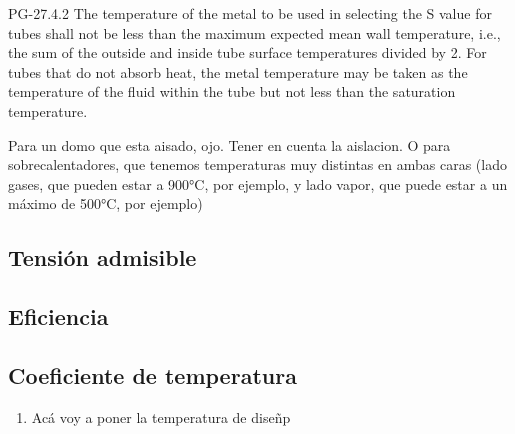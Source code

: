 PG-27.4.2
The temperature of the metal to be used
in selecting the S value for tubes shall not be less than the
maximum expected mean wall temperature, i.e., the sum
of the outside and inside tube surface temperatures
divided by 2. For tubes that do not absorb heat, the
metal temperature may be taken as the temperature of
the fluid within the tube but not less than the saturation
temperature.

Para un domo que esta aisado, ojo. Tener en cuenta la aislacion. O para sobrecalentadores, que tenemos temperaturas muy distintas en ambas caras (lado gases, que pueden estar a 900°C, por ejemplo, y lado vapor, que puede estar a un máximo de 500°C, por ejemplo)


\subsection{Tensión admisible}

\subsection{Eficiencia}

\subsection{Coeficiente de temperatura}

\begin{enumerate}
     \item Acá voy a poner la temperatura de diseñp
\end{enumerate}




















